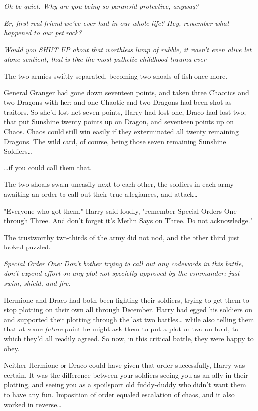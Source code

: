 \emph{Oh be quiet. Why are you being so paranoid-protective, anyway?}

\emph{Er, first real friend we've ever had in our whole life? Hey, remember
what happened to our pet rock?}

\emph{Would you SHUT UP about that worthless lump of rubble, it wasn't even
alive let alone sentient, that is like the most pathetic childhood trauma
ever---}

The two armies swiftly separated, becoming two shoals of fish once more.

General Granger had gone down seventeen points, and taken three Chaotics and
two Dragons with her; and one Chaotic and two Dragons had been shot as
traitors. So she'd lost net seven points, Harry had lost one, Draco had lost
two; that put Sunshine twenty points up on Dragon, and seventeen points up on
Chaos. Chaos could still win easily if they exterminated all twenty remaining
Dragons. The wild card, of course, being those seven remaining Sunshine
Soldiers{\ldots}

{\ldots}if you could call them that.

The two shoals swam uneasily next to each other, the soldiers in each army
awaiting an order to call out their true allegiances, and attack{\ldots}

"Everyone who got them," Harry said loudly, "remember Special Orders One
through Three. And don't forget it's Merlin Says on Three. Do not acknowledge."

The trustworthy two-thirds of the army did not nod, and the other third just
looked puzzled.

\emph{Special Order One: Don't bother trying to call out any codewords in this
battle, don't expend effort on any plot not specially approved by the
commander; just swim, shield, and fire.}

Hermione and Draco had both been fighting their soldiers, trying to get them to
stop plotting on their own all through December. Harry had egged his soldiers
on and supported their plotting through the last two battles{\ldots} while also
telling them that at some \emph{future} point he might ask them to put a plot
or two on hold, to which they'd all readily agreed. So now, in this critical
battle, they were happy to obey.

Neither Hermione or Draco could have given that order successfully, Harry was
certain. It was the difference between your soldiers seeing you as an ally in
their plotting, and seeing you as a spoilsport old fuddy-duddy who didn't want
them to have any fun. Imposition of order equaled escalation of chaos, and it
also worked in reverse{\ldots}

